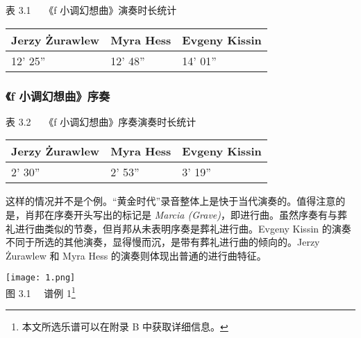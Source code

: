     \begin{center}
    \heiti \fontsize{10.5}{12.6}\selectfont 表 3.1 \ \ 《f 小调幻想曲》演奏时长统计
    \end{center}
    \begin{longtable}{|l|l|l|}
    \hline
        Jerzy Żurawlew & Myra Hess & Evgeny Kissin \\ \hline
        12’ 25” & 12’ 48” & 14’ 01” \\ \hline
    \end{longtable}

    \subsubsection{\heiti \fontsize{14}{16.8}\selectfont 《f 小调幻想曲》序奏}

    \begin{center}
    \heiti \fontsize{10.5}{12.6}\selectfont 表 3.2 \ \ 《f 小调幻想曲》序奏演奏时长统计
    \end{center}
    \begin{longtable}{|l|l|l|}
    \hline
        Jerzy Żurawlew & Myra Hess & Evgeny Kissin \\ \hline
        2’ 30” & 2’ 53” & 3’ 19” \\ \hline
    \end{longtable}


    这样的情况并不是个例。“黄金时代”录音整体上是快于当代演奏的。值得注意的是，肖邦在序奏开头写出的标记是 \textit{Marcia (Grave)}，即进行曲。虽然序奏有与葬礼进行曲类似的节奏，但肖邦从未表明序奏是葬礼进行曲。Evgeny Kissin 的演奏不同于所选的其他演奏，显得慢而沉，是带有葬礼进行曲的倾向的。Jerzy Żurawlew 和 Myra Hess 的演奏则体现出普通的进行曲特征。

    \begin{center}\texttt{[image: 1.png]}\\
    \heiti \fontsize{10.5}{12.6}\selectfont 图 3.1 \ \ 谱例 1\footnote{本文所选乐谱可以在附录 B 中获取详细信息。}
    \end{center}


